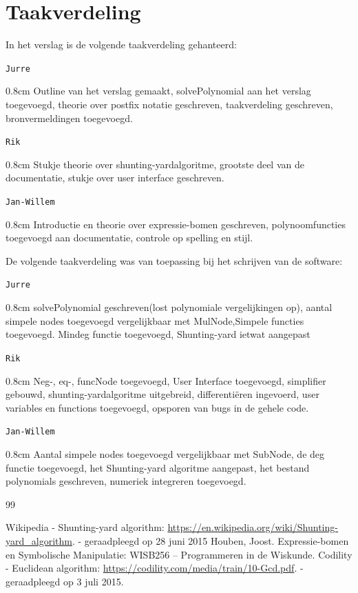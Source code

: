 \documentclass[a4paper]{article}
\newcommand{\com}[2]{\texttt{#1}\mbox{}\vspace{-2ex}\begin{adjustwidth}{0.8cm}{} #2 \end{adjustwidth}}
\begin{document}
\section{Taakverdeling}
In het verslag is de volgende taakverdeling gehanteerd:

\com{Jurre} {Outline van het verslag gemaakt, solvePolynomial aan het verslag toegevoegd, theorie over postfix notatie geschreven, taakverdeling geschreven, bronvermeldingen toegevoegd.}

\com{Rik} {Stukje theorie over shunting-yardalgoritme, grootste deel van de documentatie, stukje over user interface geschreven.}
\com{Jan-Willem} {Introductie en theorie over expressie-bomen geschreven, polynoomfuncties toegevoegd aan documentatie, controle op spelling en stijl.}

De volgende taakverdeling was van toepassing bij het schrijven van de software:

\com{Jurre} {solvePolynomial geschreven(lost polynomiale vergelijkingen op), aantal simpele nodes toegevoegd vergelijkbaar met MulNode,Simpele functies toegevoegd. Mindeg functie toegevoegd, Shunting-yard ietwat aangepast}

\com{Rik} {Neg-, eq-, funcNode toegevoegd, User Interface toegevoegd, simplifier gebouwd, shunting-yardalgoritme uitgebreid, differenti\"eren ingevoerd, user variables en functions toegevoegd, opsporen van bugs in de gehele code.}

\com{Jan-Willem} {Aantal simpele nodes toegevoegd vergelijkbaar met SubNode, de deg functie toegevoegd, het Shunting-yard algoritme aangepast, het bestand polynomials geschreven, numeriek integreren toegevoegd.}

\begin{thebibliography}{99}

 Wikipedia - Shunting-yard algorithm:
\url{https://en.wikipedia.org/wiki/Shunting-yard_algorithm}. 
 - geraadpleegd op 28 juni 2015
  Houben, Joost. Expressie-bomen en Symbolische Manipulatie: WISB256 – Programmeren in de Wiskunde.
  Codility - Euclidean algorithm: \url{https://codility.com/media/train/10-Gcd.pdf}. - geraadpleegd op 3 juli 2015. 


\end{thebibliography}
\end{document}
